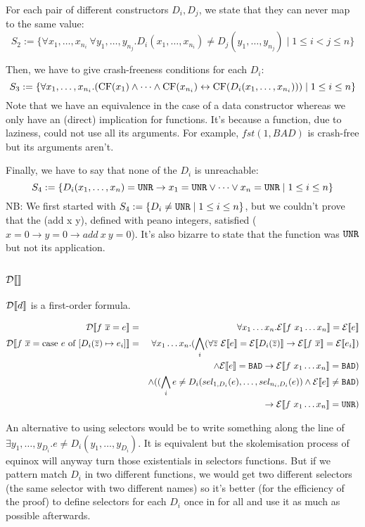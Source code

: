 \documentclass{article}
\begin{document}
For each pair of different constructors $D_i,D_j$, we state that they can never map to the same value: 
$$S_2 := \{ \forall x_1,\dots,x_{n_i}~\forall y_1,\dots,y_{n_j} . D_i(x_1,\dots,x_{n_i}) \neq D_j(y_1,\dots,y_{n_j}) \mid 1 \leq i < j \leq n \}$$

Then, we have to give crash-freeness conditions for each $D_i$:
$$S_3 := \{ \forall x_1,\dots,x_{n_i} . (\mbox{CF}(x_1) \land \dots \land \mbox{CF}(x_{n_i}) \leftrightarrow \mbox{CF}(D_i(x_1,\dots,x_{n_i}))) \mid 1 \leq i \leq n \}$$
Note that we have an equivalence in the case of a data constructor whereas we only have an (direct) implication for functions. It's because a function, due to laziness, could not use all its arguments. For example, $fst (1,BAD)$ is crash-free but its arguments aren't.

Finally, we have to say that none of the $D_i$ is unreachable:
$$S_4 := \{ D_i(x_1,\dots,x_n) = \texttt{UNR} \to x_1 = \texttt{UNR} \lor \dots \lor x_n = \texttt{UNR} \mid 1 \leq i \leq n \}$$
NB: We first started with $S_4 := \{ D_i \neq \texttt{UNR} \mid 1 \leq i \leq n \}$, but we couldn't prove that the (add x y), defined with peano integers, satisfied ($x=0 \to y=0 \to add~x~y=0$). It's also bizarre to state that the function was $\texttt{UNR}$ but not its application.

\subsection{$\mathcal{D} \llbracket  \rrbracket$}
$\mathcal{D} \llbracket d \rrbracket$ is a first-order formula.

\begin{eqnarray}
\mathcal{D} \llbracket f~\overline{x} = e \rrbracket &=& \forall x_1 \dots x_n.\mathcal{E} \llbracket f~x_1 \dots x_n \rrbracket = \mathcal{E} \llbracket e \rrbracket\\
\mathcal{D} \llbracket f~\overline{x} = \mbox{case } e \mbox{ of } [D_i(\overline{z}) \mapsto e_i] \rrbracket &=& \forall x_1 \dots x_n.(\bigwedge_i (\forall \overline{z}~\mathcal{E} \llbracket e \rrbracket = \mathcal{E} \llbracket D_i(\overline{z}) \rrbracket \to \mathcal{E} \llbracket f~\overline{x} \rrbracket = \mathcal{E} \llbracket e_i \rrbracket)\\
&& \land \mathcal{E} \llbracket e \rrbracket = \texttt{BAD} \to \mathcal{E} \llbracket f~x_1 \dots x_n \rrbracket = \texttt{BAD})\\ 
&& \land ((\bigwedge_i e \neq D_i(sel_{1,D_i}(e),\dots,sel_{n_i,D_i}(e)) \land \mathcal{E} \llbracket e \rrbracket \neq \texttt{BAD})\\
&& ~~\to \mathcal{E} \llbracket f~x_1 \dots x_n \rrbracket = \texttt{UNR})
\end{eqnarray}

An alternative to using selectors would be to write something along the line of $\exists y_1,\dots,y_{D_i}. e \neq D_i(y_1,\dots,y_{D_i})$. It is equivalent but the skolemisation process of equinox will anyway turn those existentials in selectors functions. But if we pattern match $D_i$ in two different functions, we would get two different selectors (the same selector with two different names) so it's better (for the efficiency of the proof) to define selectors for each $D_i$ once in for all and use it as much as possible afterwards.
\end{document}
